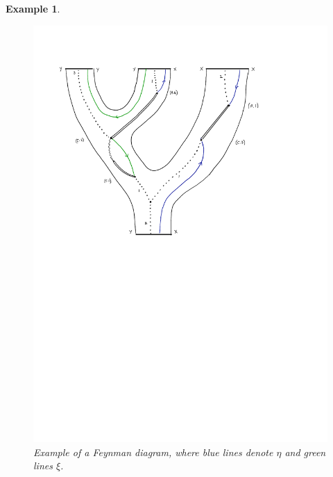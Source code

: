 \documentclass[english,letter paper,12pt,leqno]{article}
\theoremstyle{example}
\newtheorem{example}[theorem]{Example}
\newtheorem{remark}[theorem]{Remark}
\numberwithin{equation}{section}
\begin{document}
\begin{example}
\begin{figure}
\begin{center}
\includegraphics[scale=1.0]{dia16}
\end{center}
\centering
\caption{Example of a Feynman diagram, where blue lines denote $\eta$ and green lines $\xi$.}\label{fig:feynman_1}
\end{figure}
\end{example}

\end{document}
